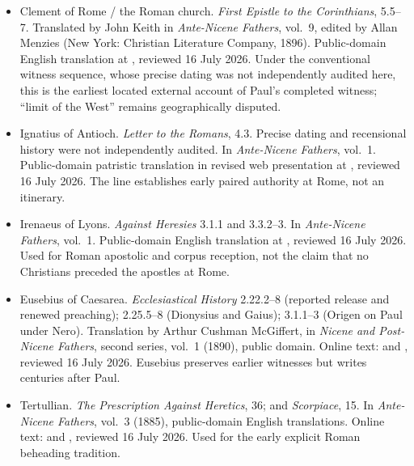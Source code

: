 \begin{itemize}
\item Clement of Rome / the Roman church. \emph{First Epistle to the
  Corinthians}, 5.5--7. Translated by John Keith in \emph{Ante-Nicene
  Fathers}, vol.~9, edited by Allan Menzies (New York: Christian Literature
  Company, 1896). Public-domain English translation at
  ,
  reviewed 16 July 2026. Under the conventional witness sequence, whose
  precise dating was not independently audited here, this is the earliest
  located external account of Paul's completed witness; ``limit of the West''
  remains geographically disputed.

\item Ignatius of Antioch. \emph{Letter to the Romans}, 4.3. Precise dating
  and recensional history were not independently audited. In
  \emph{Ante-Nicene Fathers}, vol.~1. Public-domain patristic
  translation in revised web presentation at
  , reviewed
  16 July 2026. The line establishes early paired authority at Rome, not an
  itinerary.

\item Irenaeus of Lyons. \emph{Against Heresies} 3.1.1 and 3.3.2--3. In
  \emph{Ante-Nicene Fathers}, vol.~1. Public-domain English translation at
  ,
  reviewed 16 July 2026. Used for Roman apostolic and corpus reception, not the
  claim that no Christians preceded the apostles at Rome.

\item Eusebius of Caesarea. \emph{Ecclesiastical History} 2.22.2--8
  (reported release and renewed preaching); 2.25.5--8 (Dionysius and Gaius);
  3.1.1--3 (Origen on Paul under Nero). Translation by Arthur Cushman
  McGiffert, in \emph{Nicene and Post-Nicene Fathers}, second series, vol.~1
  (1890), public domain. Online text:
   and
  , reviewed
  16 July 2026. Eusebius preserves earlier witnesses but writes centuries
  after Paul.

\item Tertullian. \emph{The Prescription Against Heretics}, 36; and
  \emph{Scorpiace}, 15. In \emph{Ante-Nicene Fathers}, vol.~3 (1885),
  public-domain English translations. Online text:
   and
  , reviewed
  16 July 2026. Used for the early explicit Roman beheading tradition.


\end{itemize}
